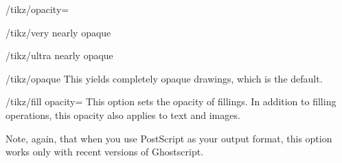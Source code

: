 \begin{key}{/tikz/opacity=}
    \begin{stylekey}{/tikz/very nearly opaque}
\begin{codeexample}[]
\end{codeexample}
    \end{stylekey}

    \begin{stylekey}{/tikz/ultra nearly opaque}
\begin{codeexample}[]
\end{codeexample}
    \end{stylekey}

    \begin{stylekey}{/tikz/opaque}
        This yields completely opaque drawings, which is the default.
\begin{codeexample}[]
\end{codeexample}
    \end{stylekey}
\end{key}

\begin{key}{/tikz/fill opacity=}
    This option sets the opacity of fillings. In addition to filling
    operations, this opacity also applies to text and images.

    Note, again, that when you use PostScript as your output format, this
    option works only with recent versions of Ghostscript.
\begin{codeexample}[]
\end{codeexample}

\begin{codeexample}[]
\end{codeexample}
\end{key}

